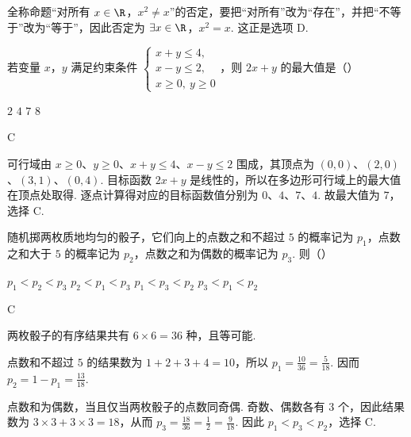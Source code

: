 \begin{solution}
全称命题“对所有 \(x\in\R\)，\(x^2\neq x\)”的否定，要把“对所有”改为“存在”，并把“不等于”改为“等于”，因此否定为 \(\exists x\in\R\)，\(x^2=x\). 这正是选项 D.
\end{solution}

\begin{problem}
若变量 \(x\)，\(y\) 满足约束条件 \(\begin{cases}
x + y \leqslant 4,\\
x - y \leqslant 2,\\
x \geqslant 0,\ y \geqslant 0
\end{cases}\)，则 \(2x + y\) 的最大值是（\quad）

\choices
    {\(2\)}
    {\(4\)}
    {\(7\)}
    {\(8\)}
\end{problem}

\begin{answer}
C
\end{answer}

\begin{solution}
可行域由 \(x\geqslant0\)、\(y\geqslant0\)、\(x+y\leqslant4\)、\(x-y\leqslant2\) 围成，其顶点为 \((0,0)\)、\((2,0)\)、\((3,1)\)、\((0,4)\). 目标函数 \(2x+y\) 是线性的，所以在多边形可行域上的最大值在顶点处取得. 逐点计算得对应的目标函数值分别为 \(0\)、\(4\)、\(7\)、\(4\).
故最大值为 \(7\)，选择 C.
\end{solution}

\begin{problem}
随机掷两枚质地均匀的骰子，它们向上的点数之和不超过 \(5\) 的概率记为 \(p_{1}\)，点数之和大于 \(5\) 的概率记为 \(p_{2}\)，点数之和为偶数的概率记为 \(p_{3}\). 则（\quad）

\choices
    {\(p_{1} < p_{2} < p_{3}\)}
    {\(p_{2} < p_{1} < p_{3}\)}
    {\(p_{1} < p_{3} < p_{2}\)}
    {\(p_{3} < p_{1} < p_{2}\)}
\end{problem}

\begin{answer}
C
\end{answer}

\begin{solution}
两枚骰子的有序结果共有 \(6\times6=36\) 种，且等可能.

点数和不超过 \(5\) 的结果数为 \(1+2+3+4=10\)，所以 \(p_1=\frac{10}{36}=\frac{5}{18}\). 因而 \(p_2=1-p_1=\frac{13}{18}\).

点数和为偶数，当且仅当两枚骰子的点数同奇偶. 奇数、偶数各有 \(3\) 个，因此结果数为 \(3\times3+3\times3=18\)，从而 \(p_3=\frac{18}{36}=\frac{1}{2}=\frac{9}{18}\). 因此 \(p_1<p_3<p_2\)，选择 C.
\end{solution}

